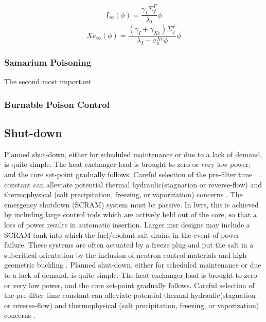  
\begin{equation}\label{eqn:eqI}
    I_{\infty}(\phi) = \frac{\gamma_I \Sigma_f^F }{\lambda_I}\phi
\end{equation}
\begin{equation}\label{eqn:eqXe}
    Xe_{\infty}(\phi) = \frac{(\gamma_I+\gamma_{Xe}) \Sigma_f^F }{\lambda_I+\sigma_a^{Xe}\phi}\phi
\end{equation}

\subsubsection{Samarium Poisoning}
The second most important

\subsubsection{Burnable Poison Control}


\subsection{Shut-down}
Planned shut-down, either for scheduled maintenance or due to a lack of demand, is quite simple. The heat exchanger load is brought to zero or very low power, and the core set-point gradually follows. Careful selection of the pre-filter time constant can alleviate potential thermal hydraulic(\eg stagnation or reverse-flow) and thermophysical (\eg salt precipitation, freezing, or vaporization) concerns \cite{CarterNumerical}. The emergency shutdown (\ie SCRAM) system must be passive. In \acsp{lwr}, this is achieved by including large control rods which are actively held out of the core, so that a loss of power results in automatic insertion. Larger \acs{msr} designs may include a SCRAM tank into which the fuel/coolant salt drains in the event of power failure. These systems are often actuated by a freeze plug \cite{FreezePlug} and put the salt in a subcritical orientation by the inclusion of neutron control materials \cite[Ch. 1]{Charit} and high geometric buckling \cite[Ch. 6]{Lamarsh}.
Planned shut-down, either for scheduled maintenance or due to a lack of demand, is quite simple. The heat exchanger load is brought to zero or very low power, and the core set-point gradually follows. Careful selection of the pre-filter time constant can alleviate potential thermal hydraulic(\eg stagnation or reverse-flow) and thermophysical (\eg salt precipitation, freezing, or vaporization) concerns \cite{CarterNumerical}. 

